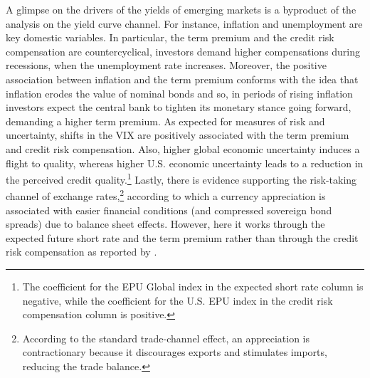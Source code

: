 {%

A glimpse on the drivers of the yields of emerging markets is a byproduct of the analysis on the yield curve channel.
For instance, inflation and unemployment are key domestic variables.
In particular, the term premium and the credit risk compensation are countercyclical, investors demand higher compensations during recessions, when the unemployment rate increases. 
Moreover, the positive association between inflation and the term premium conforms with the idea that inflation erodes the value of nominal bonds and so, in periods of rising inflation investors expect the central bank to tighten its monetary stance going forward, demanding a higher term premium. 
As expected for measures of risk and uncertainty, shifts in the VIX are positively associated with the term premium and credit risk compensation. %
Also, higher global economic uncertainty induces a flight to quality, whereas higher U.S. economic uncertainty leads to a reduction in the perceived credit quality.\footnote{ The coefficient for the EPU Global index in the expected short rate column is negative, while the coefficient for the U.S. EPU index in the credit risk compensation column is positive.}
Lastly, there is evidence supporting the risk-taking channel of exchange rates,\footnote{ According to the standard trade-channel effect, an appreciation is contractionary because it discourages exports and stimulates imports, reducing the trade balance.} 
according to which a currency appreciation is associated with easier financial conditions (and compressed sovereign bond spreads) due to balance sheet effects.
However, here it works through the expected future short rate and the term premium rather than through the credit risk compensation as reported by \cite{HofmannShimShin:2019}.

}
